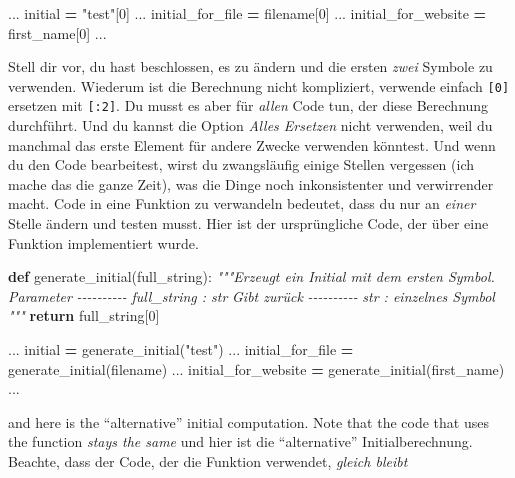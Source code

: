 \documentclass[
]{book}
\newenvironment{Shaded}{\begin{snugshade}}{\end{snugshade}}
\newcommand{\CommentTok}[1]{\textcolor[rgb]{0.56,0.35,0.01}{\textit{#1}}}
\newcommand{\ControlFlowTok}[1]{\textcolor[rgb]{0.13,0.29,0.53}{\textbf{#1}}}
\newcommand{\DecValTok}[1]{\textcolor[rgb]{0.00,0.00,0.81}{#1}}
\newcommand{\KeywordTok}[1]{\textcolor[rgb]{0.13,0.29,0.53}{\textbf{#1}}}
\newcommand{\NormalTok}[1]{#1}
\newcommand{\OperatorTok}[1]{\textcolor[rgb]{0.81,0.36,0.00}{\textbf{#1}}}
\newcommand{\StringTok}[1]{\textcolor[rgb]{0.31,0.60,0.02}{#1}}
\begin{document}
\begin{Shaded}
\begin{Highlighting}[]
\NormalTok{...}
\NormalTok{initial }\OperatorTok{=} \StringTok{"test"}\NormalTok{[}\DecValTok{0}\NormalTok{]}
\NormalTok{...}
\NormalTok{initial\_for\_file }\OperatorTok{=}\NormalTok{ filename[}\DecValTok{0}\NormalTok{]}
\NormalTok{...}
\NormalTok{initial\_for\_website }\OperatorTok{=}\NormalTok{ first\_name[}\DecValTok{0}\NormalTok{]}
\NormalTok{...}
\end{Highlighting}
\end{Shaded}

Stell dir vor, du hast beschlossen, es zu ändern und die ersten \emph{zwei} Symbole zu verwenden. Wiederum ist die Berechnung nicht kompliziert, verwende einfach \texttt{{[}0{]}} ersetzen mit \texttt{{[}:2{]}}. Du musst es aber für \emph{allen} Code tun, der diese Berechnung durchführt. Und du kannst die Option \emph{Alles Ersetzen} nicht verwenden, weil du manchmal das erste Element für andere Zwecke verwenden könntest. Und wenn du den Code bearbeitest, wirst du zwangsläufig einige Stellen vergessen (ich mache das die ganze Zeit), was die Dinge noch inkonsistenter und verwirrender macht. Code in eine Funktion zu verwandeln bedeutet, dass du nur an \emph{einer} Stelle ändern und testen musst. Hier ist der ursprüngliche Code, der über eine Funktion implementiert wurde.

\begin{Shaded}
\begin{Highlighting}[]
\KeywordTok{def}\NormalTok{ generate\_initial(full\_string):}
    \CommentTok{"""Erzeugt ein Initial mit dem ersten Symbol.}
\CommentTok{    }
\CommentTok{    Parameter}
\CommentTok{    {-}{-}{-}{-}{-}{-}{-}{-}{-}{-}}
\CommentTok{    full\_string : str}
\CommentTok{    }
\CommentTok{    Gibt zurück}
\CommentTok{    {-}{-}{-}{-}{-}{-}{-}{-}{-}{-}}
\CommentTok{    str : einzelnes Symbol}
\CommentTok{    """}
    \ControlFlowTok{return}\NormalTok{ full\_string[}\DecValTok{0}\NormalTok{]}

\NormalTok{...}
\NormalTok{initial }\OperatorTok{=}\NormalTok{ generate\_initial(}\StringTok{"test"}\NormalTok{)}
\NormalTok{...}
\NormalTok{initial\_for\_file }\OperatorTok{=}\NormalTok{ generate\_initial(filename)}
\NormalTok{...}
\NormalTok{initial\_for\_website }\OperatorTok{=}\NormalTok{ generate\_initial(first\_name)}
\NormalTok{...}
\end{Highlighting}
\end{Shaded}

and here is the ``alternative'' initial computation. Note that the code that uses the function \emph{stays the same}
und hier ist die ``alternative'' Initialberechnung. Beachte, dass der Code, der die Funktion verwendet, \emph{gleich bleibt}
\end{document}
